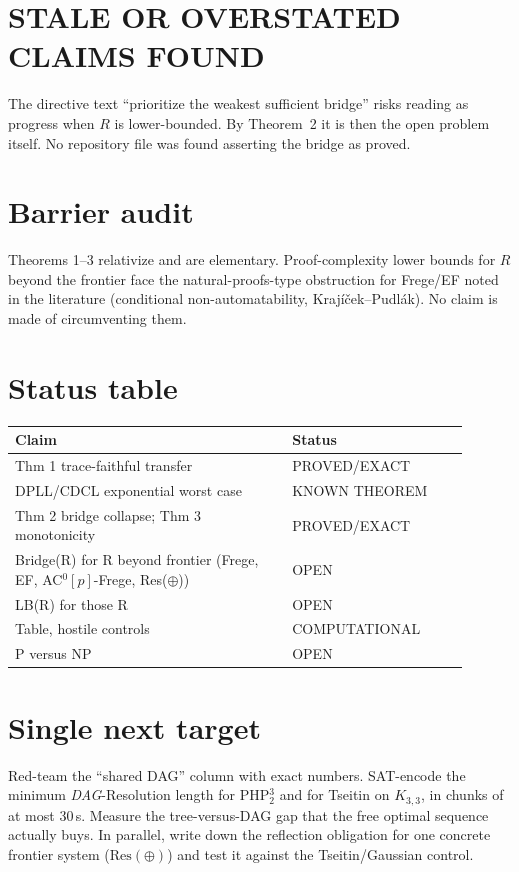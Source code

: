 \documentclass[11pt]{article}
\begin{document}
\section*{STALE OR OVERSTATED CLAIMS FOUND}
The directive text ``prioritize the weakest sufficient bridge'' risks reading
as progress when $R$ is lower-bounded. By Theorem~2 it is then the open problem
itself. No repository file was found asserting the bridge as proved.

\section*{Barrier audit}
Theorems 1--3 relativize and are elementary. Proof-complexity lower bounds for
$R$ beyond the frontier face the natural-proofs-type obstruction for Frege/EF
noted in the literature (conditional non-automatability, Krajíček--Pudlák). No
claim is made of circumventing them.

\section*{Status table}
\begin{longtable}{p{0.55\linewidth}p{0.35\linewidth}}
\toprule
Claim & Status\\ \midrule
Thm 1 trace-faithful transfer & PROVED/EXACT\\
DPLL/CDCL exponential worst case & KNOWN THEOREM\\
Thm 2 bridge collapse; Thm 3 monotonicity & PROVED/EXACT\\
Bridge(R) for R beyond frontier (Frege, EF, AC$^0[p]$-Frege, Res($\oplus$)) & OPEN\\
LB(R) for those R & OPEN\\
Table, hostile controls & COMPUTATIONAL\\
P versus NP & OPEN\\ \bottomrule
\end{longtable}

\section*{Single next target}
Red-team the ``shared DAG'' column with exact numbers. SAT-encode the minimum
\emph{DAG}-Resolution length for PHP$^3_2$ and for Tseitin on $K_{3,3}$, in
chunks of at most 30\,s. Measure the tree-versus-DAG gap that the free optimal
sequence actually buys. In parallel, write down the reflection obligation for
one concrete frontier system ($\mathrm{Res}(\oplus)$) and test it against the
Tseitin/Gaussian control.
\end{document}
